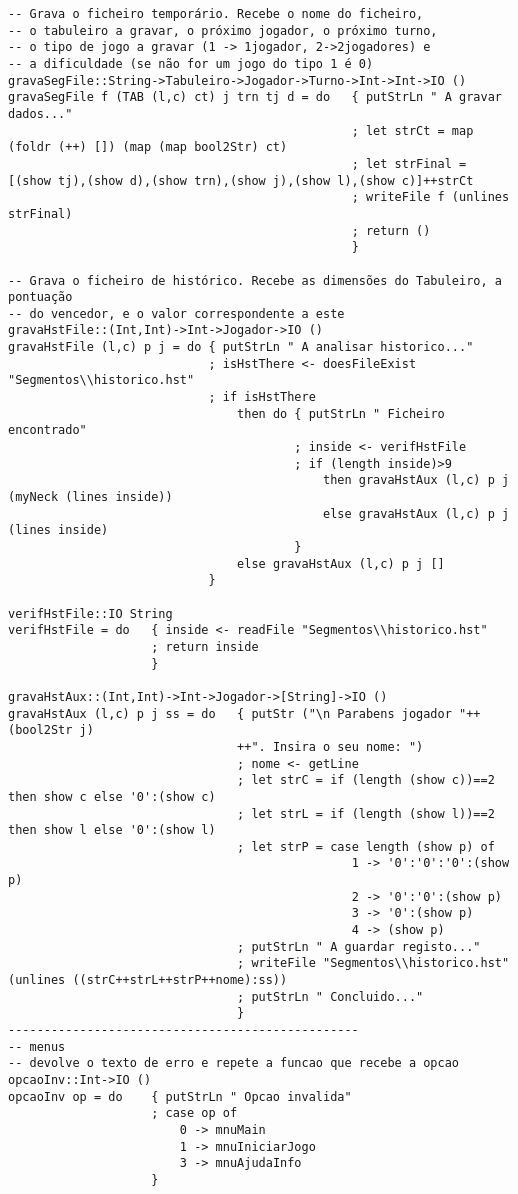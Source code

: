 \documentclass[a4paper,titlepage]{scrreprt}
\begin{document}
\begin{verbatim}
-- Grava o ficheiro temporário. Recebe o nome do ficheiro,
-- o tabuleiro a gravar, o próximo jogador, o próximo turno,
-- o tipo de jogo a gravar (1 -> 1jogador, 2->2jogadores) e
-- a dificuldade (se não for um jogo do tipo 1 é 0)
gravaSegFile::String->Tabuleiro->Jogador->Turno->Int->Int->IO ()
gravaSegFile f (TAB (l,c) ct) j trn tj d = do	{ putStrLn " A gravar dados..."
												; let strCt = map (foldr (++) []) (map (map bool2Str) ct)
												; let strFinal = [(show tj),(show d),(show trn),(show j),(show l),(show c)]++strCt
												; writeFile f (unlines strFinal)
												; return ()
												}

-- Grava o ficheiro de histórico. Recebe as dimensões do Tabuleiro, a pontuação
-- do vencedor, e o valor correspondente a este
gravaHstFile::(Int,Int)->Int->Jogador->IO ()
gravaHstFile (l,c) p j = do	{ putStrLn " A analisar historico..."
							; isHstThere <- doesFileExist "Segmentos\\historico.hst"
							; if isHstThere
								then do	{ putStrLn " Ficheiro encontrado"
										; inside <- verifHstFile
										; if (length inside)>9
											then gravaHstAux (l,c) p j (myNeck (lines inside))
											else gravaHstAux (l,c) p j (lines inside)
										}										
								else gravaHstAux (l,c) p j []
							}

verifHstFile::IO String
verifHstFile = do	{ inside <- readFile "Segmentos\\historico.hst"
					; return inside
					}

gravaHstAux::(Int,Int)->Int->Jogador->[String]->IO ()
gravaHstAux (l,c) p j ss = do	{ putStr ("\n Parabens jogador "++(bool2Str j)
								++". Insira o seu nome: ")
								; nome <- getLine
								; let strC = if (length (show c))==2 then show c else '0':(show c)
								; let strL = if (length (show l))==2 then show l else '0':(show l)
								; let strP = case length (show p) of
												1 -> '0':'0':'0':(show p)
												2 -> '0':'0':(show p)
												3 -> '0':(show p)
												4 -> (show p)
								; putStrLn " A guardar registo..."
								; writeFile "Segmentos\\historico.hst" (unlines ((strC++strL++strP++nome):ss))
								; putStrLn " Concluido..."
								}
-------------------------------------------------
-- menus
-- devolve o texto de erro e repete a funcao que recebe a opcao
opcaoInv::Int->IO ()
opcaoInv op = do	{ putStrLn " Opcao invalida"
					; case op of
						0 -> mnuMain
						1 -> mnuIniciarJogo
						3 -> mnuAjudaInfo
					}


\end{verbatim}
\end{document}
